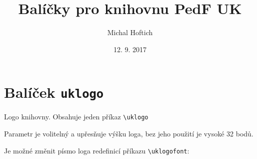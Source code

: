 \documentclass{article}
\begin{document}
\title{Balíčky pro knihovnu PedF UK}
\author{Michal Hoftich}
\date{12. 9. 2017}
\maketitle

\section{Balíček \texttt{uklogo}}

Logo knihovny. Obsahuje jeden příkaz \verb|\uklogo|

\begin{LTXexample}
  \uklogo
  \uklogo[24pt]
\end{LTXexample}

Parametr je volitelný a upřesňuje výšku loga, bez jeho použití je vysoké 32 bodů.

Je možné změnit písmo loga redefinicí příkazu \verb|\uklogofont|:

\begin{LTXexample}
  \newfontfamily{}
  \uklogo
\end{LTXexample}
\end{document}
